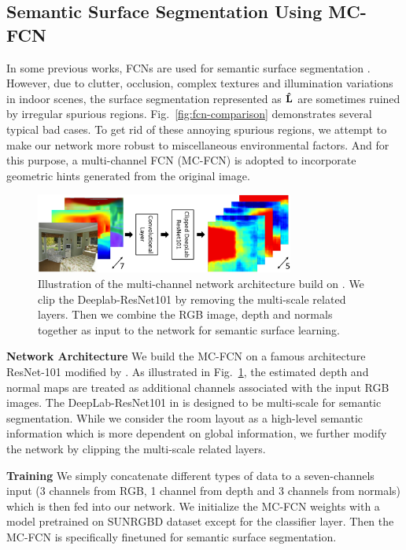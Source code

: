 \subsection{Semantic Surface Segmentation Using MC-FCN}
\label{sec:surfacelabel}
In some previous works, FCNs are used for semantic surface segmentation \cite{dasgupta2016delay,ren2016coarse,mallya2015learning}. 
%
However, due to clutter, occlusion, complex textures and illumination variations in indoor scenes, the surface segmentation represented as $\mathbf{\hat{L}}$ are sometimes ruined by irregular spurious regions. Fig.~\ref{fig:fcn-comparison} demonstrates several typical bad cases.
%
To get rid of these annoying spurious regions, we attempt to make our network more robust to miscellaneous environmental factors. And for this purpose, a multi-channel FCN (MC-FCN) is adopted to incorporate geometric hints generated from the original image. 
%


\begin{figure}
	\centering
	\includegraphics[width=8.5cm]{figure/MC-FCN.png}
	\caption{Illustration of the multi-channel network architecture build on \cite{chen2016deeplab}. We clip the Deeplab-ResNet101 by removing the multi-scale related layers. Then we combine the RGB image, depth and normals together as input to the network for semantic surface learning. }
	\label{fig:fcn-multi-channel}
\end{figure}


\textbf{Network Architecture}
We build the MC-FCN on a famous architecture ResNet-101 \cite{he2016deep} modified by \cite{chen2016deeplab}. As illustrated in Fig.~\ref{fig:fcn-multi-channel}, the estimated depth and normal maps are treated as additional channels associated with the input RGB images. The DeepLab-ResNet101 in \cite{chen2016deeplab} is designed to be multi-scale for semantic segmentation. While we consider the room layout as a high-level semantic information which is more dependent on global information, we further modify the network by clipping the multi-scale related layers. 

\textbf{Training}
We simply concatenate different types of data to a seven-channels input (3 channels from RGB, 1 channel from depth and 3 channels from normals) which is then fed into our network. We initialize the MC-FCN weights with a model pretrained on SUNRGBD dataset except for the classifier layer. Then the MC-FCN is specifically finetuned for semantic surface segmentation. 
%

